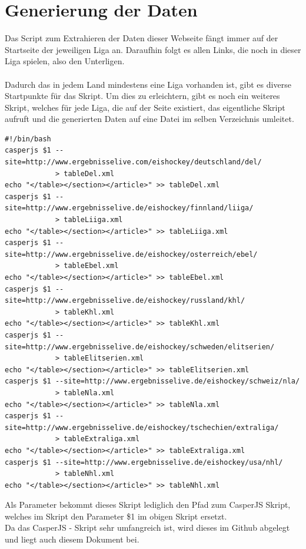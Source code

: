 \chapter{Generierung der Daten}
Das Script zum Extrahieren der Daten dieser Webseite \cite{Daten} f\"angt immer auf der Startseite der jeweiligen Liga an.
Daraufhin folgt es allen Links, die noch in dieser Liga spielen, also den Unterligen.\\
\\
Dadurch das in jedem Land mindestens eine Liga vorhanden ist, gibt es diverse Startpunkte f\"ur das Skript.
Um dies zu erleichtern, gibt es noch ein weiteres Skript, welches f\"ur jede Liga, die auf der Seite existiert, das eigentliche Skript aufruft und die generierten Daten auf eine Datei im selben Verzeichnis umleitet.\\
\begin{lstlisting}
#!/bin/bash
casperjs $1 --site=http://www.ergebnisselive.com/eishockey/deutschland/del/ 
			> tableDel.xml
echo "</table></section></article>" >> tableDel.xml
casperjs $1 --site=http://www.ergebnisselive.de/eishockey/finnland/liiga/ 
			> tableLiiga.xml
echo "</table></section></article>" >> tableLiiga.xml
casperjs $1 --site=http://www.ergebnisselive.de/eishockey/osterreich/ebel/ 
			> tableEbel.xml
echo "</table></section></article>" >> tableEbel.xml
casperjs $1 --site=http://www.ergebnisselive.de/eishockey/russland/khl/ 
			> tableKhl.xml
echo "</table></section></article>" >> tableKhl.xml
casperjs $1 --site=http://www.ergebnisselive.de/eishockey/schweden/elitserien/ 
			> tableElitserien.xml
echo "</table></section></article>" >> tableElitserien.xml
casperjs $1 --site=http://www.ergebnisselive.de/eishockey/schweiz/nla/ 
			> tableNla.xml
echo "</table></section></article>" >> tableNla.xml
casperjs $1 --site=http://www.ergebnisselive.de/eishockey/tschechien/extraliga/ 
			> tableExtraliga.xml
echo "</table></section></article>" >> tableExtraliga.xml
casperjs $1 --site=http://www.ergebnisselive.de/eishockey/usa/nhl/ 
			> tableNhl.xml
echo "</table></section></article>" >> tableNhl.xml
\end{lstlisting}

Als Parameter bekommt dieses Skript lediglich den Pfad zum CasperJS Skript, welches im Skript den Parameter \$1 im obigen Skript ersetzt. \\

Da das CasperJS - Skript sehr umfangreich ist, wird dieses im Github \cite{Code} abgelegt und liegt auch diesem Dokument bei.


